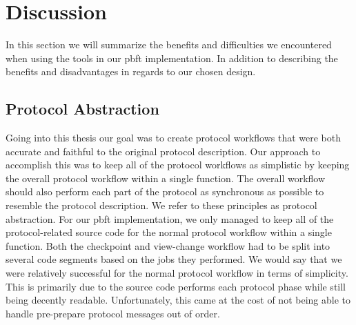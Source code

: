 \chapter{Discussion}
\label{chapter:Dis}
In this section we will summarize the benefits and difficulties we encountered when using the tools in our \ac{pbft} implementation. In addition to describing the benefits and disadvantages in regards to our chosen design.

\section{Protocol Abstraction}
Going into this thesis our goal was to create protocol workflows that were both accurate and faithful to the original protocol description. Our approach to accomplish this was to keep all of the protocol workflows as simplistic by keeping the overall protocol workflow within a single function. The overall workflow should also perform each part of the protocol as synchronous as possible to resemble the protocol description. We refer to these principles as protocol abstraction. For our \ac{pbft} implementation, we only managed to keep all of the protocol-related source code for the normal protocol workflow within a single function. Both the checkpoint and view-change workflow had to be split into several code segments based on the jobs they performed. We would say that we were relatively successful for the normal protocol workflow in terms of simplicity. This is primarily due to the source code performs each protocol phase while still being decently readable. Unfortunately, this came at the cost of not being able to handle pre-prepare protocol messages out of order.

